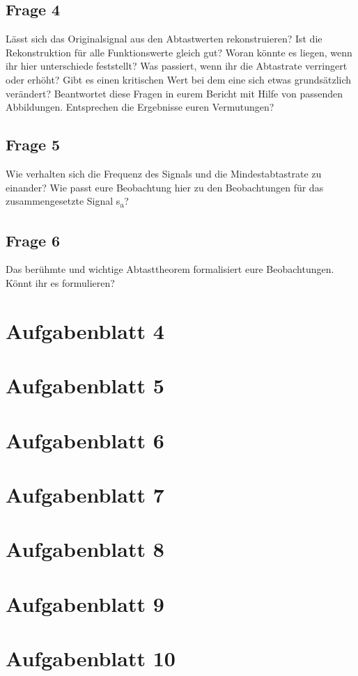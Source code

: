 \documentclass[a4paper, 11pt]{article}
\begin{document}
    
    
    


    
    
    \subsection{Frage 4}
     Lässt sich das Originalsignal aus den Abtastwerten rekonstruieren?
     Ist die Rekonstruktion für alle Funktionswerte gleich gut?
     Woran könnte es liegen, wenn ihr hier unterschiede feststellt?
     Was passiert, wenn ihr die Abtastrate verringert oder erhöht?
     Gibt es einen kritischen Wert bei dem eine sich etwas grundsätzlich verändert?
     Beantwortet diese Fragen in eurem Bericht mit Hilfe von passenden Abbildungen. Entsprechen die Ergebnisse euren Vermutungen?


    \subsection{Frage 5}
    Wie verhalten sich die Frequenz des Signals und die Mindestabtastrate zu einander?
    Wie passt eure Beobachtung hier zu den Beobachtungen für das zusammengesetzte Signal s\textsubscript{a}?

    \subsection{Frage 6}
    Das berühmte und wichtige Abtasttheorem formalisiert eure Beobachtungen. Könnt ihr es formulieren?


\section{Aufgabenblatt 4}

\section{Aufgabenblatt 5}

\section{Aufgabenblatt 6}

\section{Aufgabenblatt 7}

\section{Aufgabenblatt 8}

\section{Aufgabenblatt 9}

\section{Aufgabenblatt 10}
\end{document}
